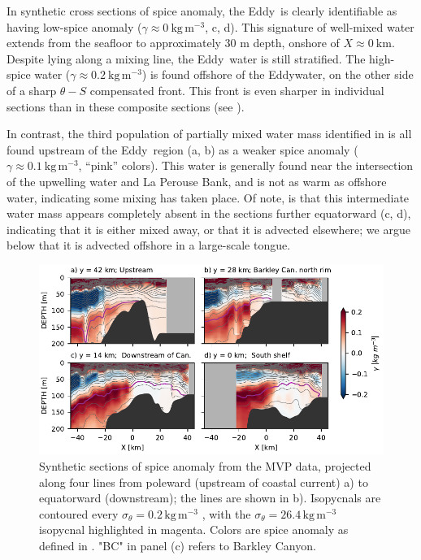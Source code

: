 \documentclass[draft]{agujournal2019}
\newcommand*{\Eddy}{{\sc Eddy}}
\begin{document}
In synthetic cross sections of spice anomaly, the \Eddy\ is clearly identifiable as having low-spice anomaly ($\gamma \approx 0\ \mathrm{kg\,m^{-3}}$, c, d).  This signature of well-mixed water extends from the seafloor to approximately 30 m depth, onshore of $X \approx 0\ \mathrm{km}$.  Despite lying along a mixing line, the \Eddy\ water is still stratified.  The high-spice water ($\gamma \approx 0.2\ \mathrm{kg\,m^{-3}}$) is found offshore of the \Eddy water, on the other side of a sharp $\theta-S$ compensated front. This front is even sharper in individual sections than in these composite sections (see ).

In contrast, the third population of partially mixed water mass identified in  is all found upstream of the \Eddy\ region (a, b) as a weaker spice anomaly ($\gamma \approx 0.1\ \mathrm{kg\,m^{-3}}$, ``pink'' colors).  This water is generally found near the intersection of the upwelling water and La Perouse Bank, and is not as warm as offshore water, indicating some mixing has taken place.  Of note, is that this intermediate water mass appears completely absent in the sections further equatorward (c, d), indicating that it is either mixed away, or that it is advected elsewhere; we argue below that it is advected offshore in a large-scale tongue.

\begin{figure}[htbp]
  \begin{center}
    \includegraphics[width=6.2in]{CrossSectionsSpice}
    \caption{Synthetic sections of spice anomaly from the MVP data, projected along four lines from poleward (upstream of coastal current) a) to equatorward (downstream); the lines are shown in b).    Isopycnals are contoured every $\sigma_{\theta} = 0.2\,\mathrm{kg\,m^{-3}}$ , with the $\sigma_{\theta} = 26.4\,\mathrm{kg\,m^{-3}}$ isopycnal highlighted in magenta.  Colors are spice anomaly as defined in . "BC" in panel (c) refers to Barkley Canyon.
      \label{fig:CrossSectionsSpice} }
  \end{center}
\end{figure}
\end{document}
